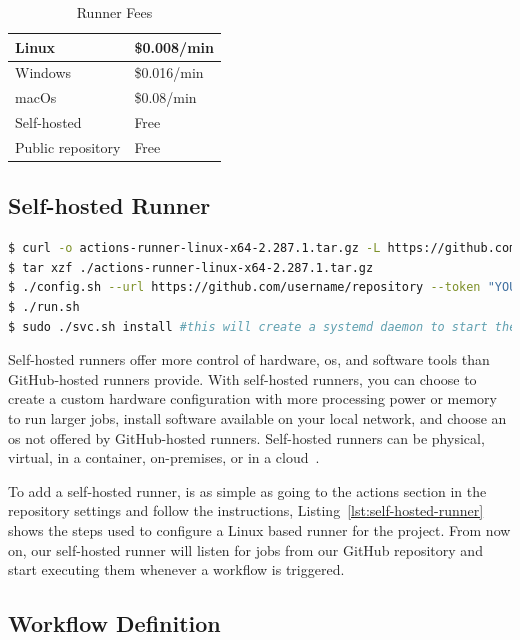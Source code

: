 \begin{table}[h]
\centering
\caption{Runner Fees}
\label{tab:action-fees}
\begin{tabular}{@{}ll@{}}
\toprule
Linux             & \$0.008/min \\ \midrule
Windows           & \$0.016/min \\ \midrule
macOs             & \$0.08/min  \\ \midrule
Self-hosted       & Free        \\ \midrule
Public repository & Free       
\end{tabular}
\end{table}

\subsection{Self-hosted Runner}

\begin{lstlisting}[language=bash, caption=Set up Self-hosted Runner,label={lst:self-hosted-runner}]
$ curl -o actions-runner-linux-x64-2.287.1.tar.gz -L https://github.com/actions/runner/releases/download/v2.287.1/actions-runner-linux-x64-2.287.1.tar.gz
$ tar xzf ./actions-runner-linux-x64-2.287.1.tar.gz
$ ./config.sh --url https://github.com/username/repository --token "YOUR TOKEN"
$ ./run.sh
$ sudo ./svc.sh install #this will create a systemd daemon to start the runner on start up
\end{lstlisting}

Self-hosted runners offer more control of hardware, \gls{os}, and software tools than GitHub-hosted runners provide. With self-hosted runners, you can choose to create a custom hardware configuration with more processing power or memory to run larger jobs, install software available on your local network, and choose an \gls{os} not offered by GitHub-hosted runners. Self-hosted runners can be physical, virtual, in a container, on-premises, or in a cloud~\cite{selfHostedRunner}.

To add a self-hosted runner, is as simple as going to the actions section in the repository settings and follow the instructions, Listing~\ref{lst:self-hosted-runner} shows the steps used to configure a Linux based runner for the project. From now on, our self-hosted runner will listen for jobs from our GitHub repository and start executing them whenever a workflow is triggered.

\subsection{Workflow Definition}

